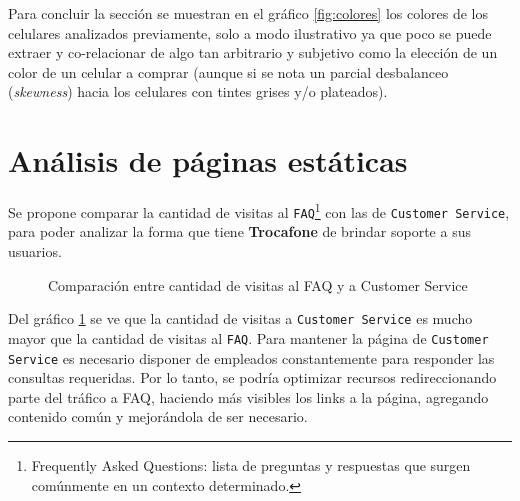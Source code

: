 \documentclass[a4paper]{article}
\begin{document}
Para concluir la sección se muestran en el gráfico \ref{fig:colores} los colores de los celulares analizados previamente, solo a modo ilustrativo ya que poco se puede extraer y co-relacionar de algo tan arbitrario y subjetivo como la elección de un color de un celular a comprar (aunque si se nota un parcial desbalanceo (\textit{skewness}) hacia los celulares con tintes grises y/o plateados).

\section{Análisis de páginas estáticas}

Se propone comparar la cantidad de visitas al \texttt{FAQ}\footnote{Frequently Asked Questions: lista de preguntas y respuestas que surgen comúnmente en un contexto determinado.} con las de \texttt{Customer Service}, para poder analizar la forma que tiene \textbf{Trocafone} de brindar soporte a sus usuarios.

\begin{figure}[h!]
	\caption{Comparación entre cantidad de visitas al FAQ y a Customer Service}
	\label{fig:staticpage}
\end{figure}

Del gráfico \ref{fig:staticpage} se ve que la cantidad de visitas a \texttt{Customer Service} es mucho mayor que la cantidad de visitas al \texttt{FAQ}. Para mantener la página de \texttt{Customer Service} es necesario disponer de empleados constantemente para responder las consultas requeridas. Por lo tanto, se podría optimizar recursos redireccionando parte del tráfico a FAQ, haciendo más visibles los links a la página, agregando contenido común y mejorándola de ser necesario.
\end{document}
